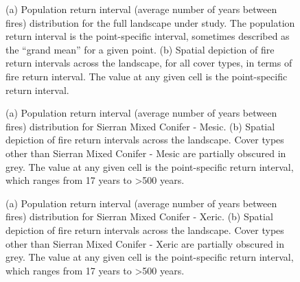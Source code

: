 \begin{figure}[!htbp]
  \centering
  \qquad
  \caption{(a) Population return interval (average number of years between fires) distribution for the full landscape under study. The population return interval is the point-specific interval, sometimes described as the ``grand mean'' for a given point. (b) Spatial depiction of fire return intervals across the landscape, for all cover types, in terms of fire return interval. The value at any given cell is the point-specific return interval.}
  \label{fig:preturn}
\end{figure}

\begin{figure}[!htbp]
  \centering
  \caption{(a) Population return interval (average number of years between fires) distribution for Sierran Mixed Conifer - Mesic.  (b) Spatial depiction of fire return intervals across the landscape. Cover types other than Sierran Mixed Conifer - Mesic are partially obscured in grey. The value at any given cell is the point-specific return interval, which ranges from 17 years to \textgreater 500 years.}
\label{fig:preturn_smcm}
\end{figure}

\begin{figure}[!htbp]
  \centering
  \caption{(a) Population return interval (average number of years between fires) distribution for Sierran Mixed Conifer - Xeric.  (b) Spatial depiction of fire return intervals across the landscape. Cover types other than Sierran Mixed Conifer - Xeric are partially obscured in grey. The value at any given cell is the point-specific return interval, which ranges from 17 years to \textgreater 500 years.}
\label{fig:preturn_smcx}
\end{figure}

